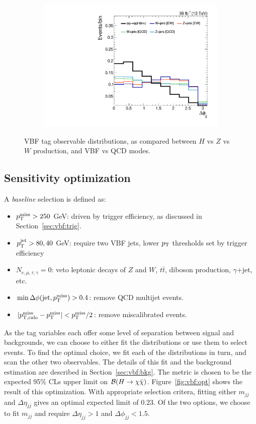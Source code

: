 \begin{figure}[]
\begin{center}
\begin{subfigure}[t]{0.32\textwidth}
            \includegraphics[width=\textwidth]{figures/vbf/shapes/loosesignal_jot12DPhi.pdf}
            \caption{\dphi}
        \end{subfigure}
        \caption{VBF tag observable distributions, as compared between $H$ vs $Z$ vs $W$ production, and VBF vs QCD modes.}
        \label{fig:vbf:dijetkins}
    \end{center}
\end{figure}

\subsection{Sensitivity optimization}

A \emph{baseline} selection is defined as:
\begin{itemize}
    \item $p_\mathrm{T}^\mathrm{miss}>250$ GeV: driven by trigger efficiency, as discussed in Section~\ref{sec:vbf:trig}.
    \item $p_\mathrm{T}^\mathrm{jet}>80,40$ GeV: require two VBF jets, lower $p_\mathrm{T}$ thresholds set by trigger efficiency
    \item $N_{e,\mu,\tau,\gamma}=0$: veto leptonic decays of $Z$ and $W$, $t\bar{t}$, diboson production, $\gamma$+jet, etc.
    \item $\min\Delta\phi(\mathrm{jet},p_\mathrm{T}^\mathrm{miss})>0.4$: remove QCD multijet events.
    \item $|p^\mathrm{miss}_\mathrm{T,calo}-p_\mathrm{T}^\mathrm{miss}|<p_\mathrm{T}^\mathrm{miss}/2$: remove miscalibrated events.
\end{itemize}

As the tag variables each offer some level of separation between signal and backgrounds, we can choose to either fit the distributions or use them to select events. 
To find the optimal choice, we fit each of the distributions in turn, and scan the other two observables.
The details of this fit and the background estimation are described in Section~\ref{sec:vbf:bkg}.
The metric is chosen to be the expected 95\% CLs upper limit on $\mathcal{B}(H\rightarrow\chi\bar\chi)$.
Figure~\ref{fig:vbf:opt} shows the result of this optimization.
With appropriate selection critera, fitting either $m_{jj}$ and $\Delta\eta_{jj}$ gives an optimal expected limit of $0.23$.
Of the two options, we choose to fit $m_{jj}$ and require $\Delta\eta_{jj}>1$ and $\Delta\phi_{jj}<1.5$.

